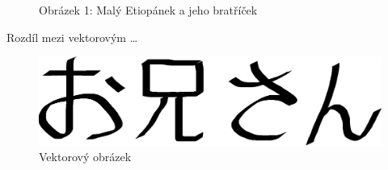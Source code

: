 \documentclass[a4paper, 11pt]{article}
\begin{document}
\begin{figure}[h]
\begin{center}
\caption{Obrázek 1: Malý Etiopánek a jeho bratříček}
\label{im1}
\end{center}
\end{figure}


Rozdíl mezi vektorovým \ldots


\begin{figure}[h]	
\begin{center} 
\includegraphics[scale=0.4]{oniisan.eps} 
\caption{Vektorový obrázek}
\label{im2}
\end{center}
\end{figure}
\end{document}
